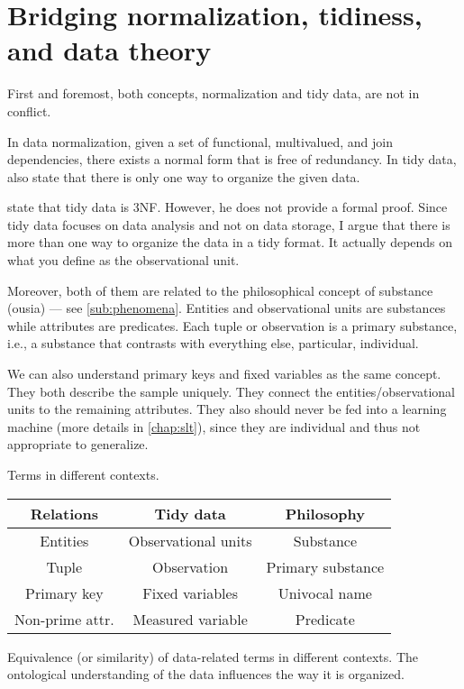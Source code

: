 \section{Bridging normalization, tidiness, and data theory}
\label{sub:bridge}

First and foremost, both concepts, normalization and tidy data, are not in conflict.

In data normalization, given a set of functional, multivalued, and join dependencies, there
exists a normal form that is free of redundancy.  In tidy data,
\textcite{Wickham2023} also state that there is only one way to organize the given data.

\textcite{Wickham2014} state that tidy data is 3NF.  However, he does not provide a
formal proof.  Since tidy data focuses on data analysis and not on data storage, I argue
that there is more than one way to organize the data in a tidy format.  It actually
depends on what you define as the observational unit.

Moreover, both of them are related to the philosophical concept of substance (ousia) ---
see \cref{sub:phenomena}.
Entities and observational units are substances while attributes are predicates.
Each tuple or observation is a primary substance, i.e., a substance that contrasts with
everything else, particular, individual.

We can also understand primary keys and fixed variables as the same concept.  They both
describe the sample uniquely.  They connect the entities/observational
units to the remaining attributes.  They also should never be fed into a learning
machine (more details in \cref{chap:slt}), since they are individual and thus not
appropriate to generalize.

\begin{tablebox}[label=fig:bridge]{Terms in different contexts.}
  \centering
  \begin{tabular}{ccc}
    \toprule
    \textbf{Relations} & \textbf{Tidy data} & \textbf{Philosophy} \\
    \midrule
    Entities & Observational units & Substance \\
    Tuple & Observation & Primary substance \\
    Primary key & Fixed variables & Univocal name \\
    Non-prime attr. & Measured variable & Predicate \\
    \bottomrule
  \end{tabular}
  \tcblower
  Equivalence (or similarity) of data-related terms in different contexts.
  The ontological understanding of the data influences the way it is organized.
\end{tablebox}

